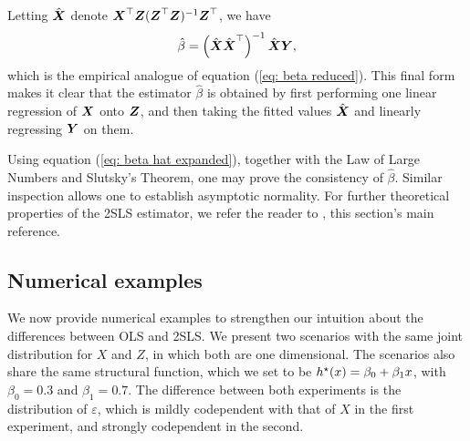 Letting $ \hat{ \boldsymbol X } $ denote $ \boldsymbol X^{ \top } \boldsymbol Z ( \boldsymbol Z^{ \top } \boldsymbol Z )^{ -1 } \boldsymbol Z^{ \top } $, we have
\begin{equation*}
    \hat{ \beta } = \left( \hat{ \boldsymbol X } \hat{ \boldsymbol X }^{ \top } \right)^{ -1 } \hat{ \boldsymbol X } \boldsymbol Y 
,\end{equation*}
which is the empirical analogue of equation (\ref{eq: beta reduced}).
This final form makes it clear that the estimator $ \hat{ \beta } $ is obtained by first performing one linear regression of $ \boldsymbol X $ onto $ \boldsymbol Z $, and then taking the fitted values $ \hat{ \boldsymbol X } $ and linearly regressing $ \boldsymbol Y $ on them.

Using equation (\ref{eq: beta hat expanded}), together with the Law of Large Numbers and Slutsky's Theorem, one may prove the consistency of $ \hat{ \beta } $.
Similar inspection allows one to establish asymptotic normality.
For further theoretical properties of the 2SLS estimator, we refer the reader to \cite[Chapter~5]{wooldridge2001}, this section's main reference.

\subsection{Numerical examples}

We now provide numerical examples to strengthen our intuition about the differences between OLS and 2SLS.
We present two scenarios with the same joint distribution for $ X $ and $ Z $, in which both are one dimensional.
The scenarios also share the same structural function, which we set to be $ h^{ \star } ( x ) = \beta_{ 0 } + \beta_{ 1 }x $, with $ \beta_{ 0 } = 0.3 $ and $ \beta_{ 1 } = 0.7 $.
The difference between both experiments is the distribution of $ \varepsilon $, which is mildly codependent with that of $ X $ in the first experiment, and strongly codependent in the second.

